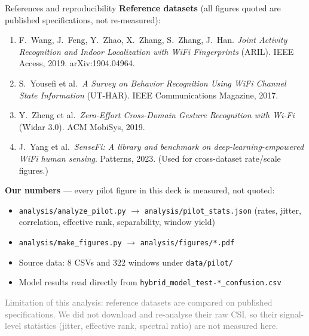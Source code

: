 \documentclass[aspectratio=169,10pt]{beamer}
\begin{document}
\begin{frame}{References and reproducibility}
\footnotesize
\textbf{Reference datasets} (all figures quoted are published specifications, not re-measured):
\begin{enumerate}
\item F.\ Wang, J.\ Feng, Y.\ Zhao, X.\ Zhang, S.\ Zhang, J.\ Han.
\textit{Joint Activity Recognition and Indoor Localization with WiFi Fingerprints} (ARIL).
IEEE Access, 2019. arXiv:1904.04964.
\item S.\ Yousefi et al.\ \textit{A Survey on Behavior Recognition Using WiFi Channel State
Information} (UT-HAR). IEEE Communications Magazine, 2017.
\item Y.\ Zheng et al.\ \textit{Zero-Effort Cross-Domain Gesture Recognition with Wi-Fi}
(Widar 3.0). ACM MobiSys, 2019.
\item J.\ Yang et al.\ \textit{SenseFi: A library and benchmark on deep-learning-empowered
WiFi human sensing}. Patterns, 2023. (Used for cross-dataset rate/scale figures.)
\end{enumerate}

\vspace{0.5em}
\textbf{Our numbers} --- every pilot figure in this deck is measured, not quoted:
\begin{itemize}
\item \texttt{analysis/analyze\_pilot.py} $\rightarrow$ \texttt{analysis/pilot\_stats.json}
(rates, jitter, correlation, effective rank, separability, window yield)
\item \texttt{analysis/make\_figures.py} $\rightarrow$ \texttt{analysis/figures/*.pdf}
\item Source data: 8 CSVs and 322 windows under \texttt{data/pilot/}
\item Model results read directly from \texttt{hybrid\_model\_test-*\_confusion.csv}
\end{itemize}

\vspace{0.5em}
\textcolor{gray}{Limitation of this analysis: reference datasets are compared on published
specifications. We did not download and re-analyse their raw CSI, so their signal-level
statistics (jitter, effective rank, spectral ratio) are not measured here.}
\end{frame}
\end{document}
